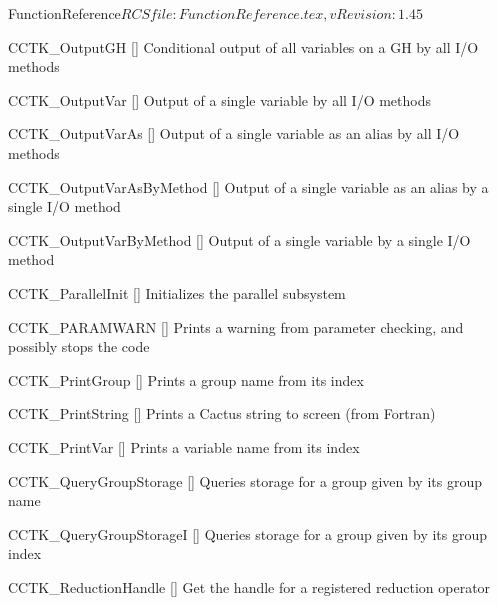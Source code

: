 \begin{cactuspart}{5}{FunctionReference}{$RCSfile: FunctionReference.tex,v $}{$Revision: 1.45 $}
\begin{Lentry}
\item[CCTK\_OutputGH]
  [\pageref{CCTK-OutputGH}]
  Conditional output of all variables on a GH by all I/O methods

\item[CCTK\_OutputVar]
  [\pageref{CCTK-OutputVar}]
  Output of a single variable by all I/O methods

\item[CCTK\_OutputVarAs]
  [\pageref{CCTK-OutputVarAs}]
  Output of a single variable as an alias by all I/O methods

\item[CCTK\_OutputVarAsByMethod]
  [\pageref{CCTK-OutputVarAsByMethod}]
  Output of a single variable as an alias by a single I/O method

\item[CCTK\_OutputVarByMethod]
  [\pageref{CCTK-OutputVarByMethod}]
  Output of a single variable by a single I/O method

\item[CCTK\_ParallelInit]
  [\pageref{CCTK-ParallelInit}]
  Initializes the parallel subsystem

\item[CCTK\_PARAMWARN]
  [\pageref{CCTK-PARAMWARN}]
  Prints a warning from parameter checking, and possibly stops the code

\item[CCTK\_PrintGroup]
  [\pageref{CCTK-PrintGroup}]
  Prints a group name from its index

\item[CCTK\_PrintString]
  [\pageref{CCTK-PrintString}]
  Prints a Cactus string to screen (from Fortran)

\item[CCTK\_PrintVar]
  [\pageref{CCTK-PrintVar}]
  Prints a variable name from its index

\item[CCTK\_QueryGroupStorage]
  [\pageref{CCTK-QueryGroupStorage}]
  Queries storage for a group given by its group name

\item[CCTK\_QueryGroupStorageI]
  [\pageref{CCTK-QueryGroupStorageI}]
  Queries storage for a group given by its group index


\item[CCTK\_ReductionHandle]
  [\pageref{CCTK-ReductionHandle}]
  Get the handle for a registered reduction operator


\end{Lentry}
\end{cactuspart}
